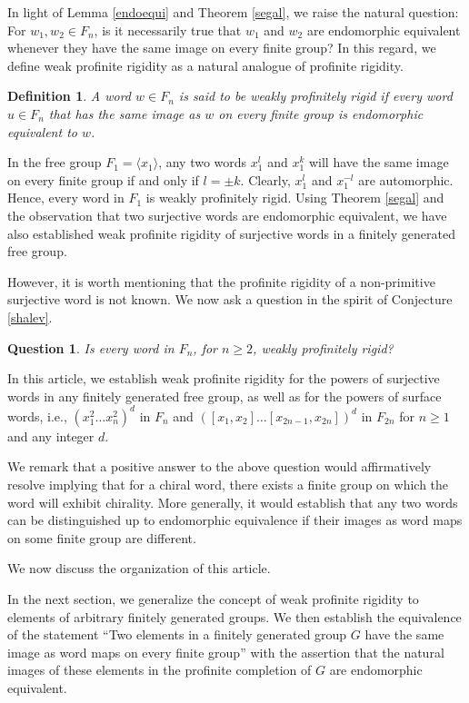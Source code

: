 \documentclass[12pt]{amsart}
\newtheorem{definition}[theorem]{Definition}
\newtheorem{qu}[theorem]{Question}
\begin{document}
In light of Lemma \ref{endoequi} and Theorem \ref{segal}, we raise the natural question: For $w_1, w_2 \in F_n$, is it necessarily true that $w_1$ and $w_2$ are endomorphic equivalent whenever they have the same image on every finite group? In this regard, we define weak profinite rigidity as a natural analogue of profinite rigidity.

\begin{definition}\label{wpr1}
    A word $w \in F_n$ is said to be weakly profinitely rigid if every word $u\in F_n$ that has the same image as $w$ on every finite group is endomorphic equivalent to $w$.
\end{definition}
In the free group $F_1 = \langle x_1 \rangle$, any two words $x_1^l$ and $x_1^k$ will have the same image on every finite group if and only if $l = \pm k$. Clearly, $x_1^l$ and $x_1^{-l}$ are automorphic. Hence, every word in $F_1$ is weakly profinitely rigid. Using Theorem \ref{segal} and the observation that two surjective words are endomorphic equivalent, we have also established weak profinite rigidity of surjective words in a finitely generated free group.

However, it is worth mentioning that the profinite rigidity of a non-primitive surjective word is not known. We now ask a question in the spirit of Conjecture \ref{shalev}.
\begin{qu}
    Is every word in $F_n$, for $n \geq 2$, weakly profinitely rigid?
\end{qu}

In this article, we establish weak profinite rigidity for the powers of surjective words in any finitely generated free group, as well as for the powers of surface words, i.e., $(x_1^2\ldots x_n^2)^d$ in $F_n$ and $([x_1,x_2]\ldots [x_{2n-1},x_{2n}])^d$ in $F_{2n}$ for $n \geq 1$ and any integer $d$. 

 We remark that a positive answer to the above question would affirmatively resolve \cite[Question~18]{Singh} implying that for a chiral word, there exists a finite group on which the word will exhibit chirality. More generally, it would establish that any two words can be distinguished up to endomorphic equivalence if their images as word maps on some finite
group are different.

We now discuss the organization of this article.

In the next section, we generalize the concept of weak profinite rigidity to elements of arbitrary finitely generated groups. We then establish the equivalence of the statement ``Two elements in a finitely generated group $G$ have the same image as word maps on every finite group'' with the assertion that the natural images of these elements in the profinite completion of $G$ are endomorphic equivalent.
\end{document}
